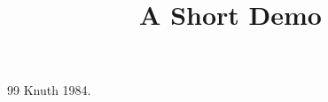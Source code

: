 \documentclass[article]{jss}
\title{A Short Demo}
\begin{document}
\begin{thebibliography}{99}
 Knuth 1984.
\end{thebibliography}
\end{document}
